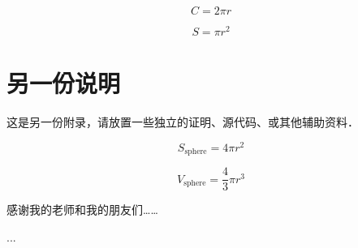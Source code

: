 \documentclass[lang=chs, degree=phd, blindreview=false, adobe=false]{yanputhesis}
\begin{document}

\begin{equation}
    C = 2 \pi r
\end{equation}

\begin{equation}
    S = \pi r^2
\end{equation}

\cleardoublepage

\chapter{另一份说明}

这是另一份附录，请放置一些独立的证明、源代码、或其他辅助资料．


\begin{equation}
    S_{\text{sphere}} = 4 \pi r^2
\end{equation}

\begin{equation}
    V_{\text{sphere}} = \frac43 \pi r^3
\end{equation}

\cleardoublepage
\backmatter                                                 %
\begin{acknowledgements}                                    %
    感谢我的老师和我的朋友们……
\end{acknowledgements}                                      %
\begin{accomplishments}                                     %
    [1] ...
\end{accomplishments}                                       %
\end{document}
